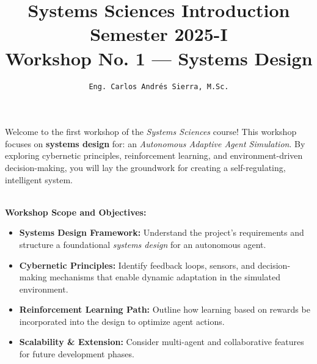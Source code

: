 \documentclass[doc]{apa6}
\title{Systems Sciences Introduction \\ Semester 2025-I \\ Workshop No. 1 --- Systems Design}
\author{\texttt{Eng. Carlos Andr\'es Sierra, M.Sc.}}
\affiliation{Computer Engineering \\ Universidad Distrital Francisco Jos\'e de Caldas}
\begin{document}
\maketitle

Welcome to the first workshop of the \textit{Systems Sciences} course! This workshop 
focuses on \textbf{systems design} for: an \emph{Autonomous Adaptive Agent Simulation}. 
By exploring cybernetic principles, reinforcement learning, and environment-driven decision-making, 
you will lay the groundwork for creating a self-regulating, intelligent system.

~\\

\noindent \textbf{Workshop Scope and Objectives:}
\begin{itemize}[leftmargin=1.4cm]
    \item \textbf{Systems Design Framework:} Understand the project’s requirements and 
            structure a foundational \textit{systems design} for an autonomous agent.
    \item \textbf{Cybernetic Principles:} Identify feedback loops, sensors, and 
            decision-making mechanisms that enable dynamic adaptation in the simulated 
            environment.
    \item \textbf{Reinforcement Learning Path:} Outline how learning based on rewards be 
            incorporated into the design to optimize agent actions.
    \item \textbf{Scalability \& Extension:} Consider multi-agent and collaborative 
            features for future development phases.
\end{itemize}
\end{document}
